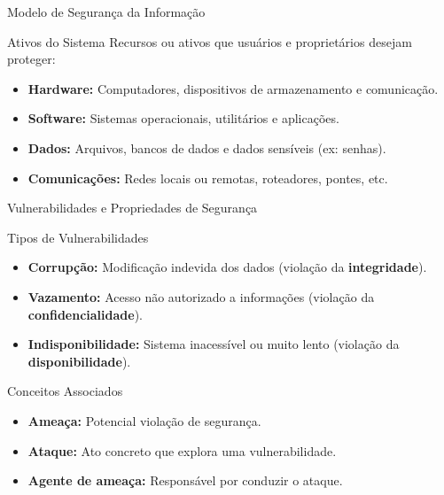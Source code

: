 \begin{frame}{Modelo de Segurança da Informação}
\begin{block}{Ativos do Sistema}
Recursos ou ativos que usuários e proprietários desejam proteger:
\begin{itemize}
  \item \textbf{Hardware:} Computadores, dispositivos de armazenamento e comunicação.
  \item \textbf{Software:} Sistemas operacionais, utilitários e aplicações.
  \item \textbf{Dados:} Arquivos, bancos de dados e dados sensíveis (ex: senhas).
  \item \textbf{Comunicações:} Redes locais ou remotas, roteadores, pontes, etc.
\end{itemize}
\end{block}
\end{frame}

\begin{frame}{Vulnerabilidades e Propriedades de Segurança}
\begin{block}{Tipos de Vulnerabilidades}
\begin{itemize}
  \item \textbf{Corrupção:} Modificação indevida dos dados (violação da \textbf{integridade}).
  \item \textbf{Vazamento:} Acesso não autorizado a informações (violação da \textbf{confidencialidade}).
  \item \textbf{Indisponibilidade:} Sistema inacessível ou muito lento (violação da \textbf{disponibilidade}).
\end{itemize}
\end{block}

\begin{block}{Conceitos Associados}
\begin{itemize}
  \item \textbf{Ameaça:} Potencial violação de segurança.
  \item \textbf{Ataque:} Ato concreto que explora uma vulnerabilidade.
  \item \textbf{Agente de ameaça:} Responsável por conduzir o ataque.
\end{itemize}
\end{block}
\end{frame}

